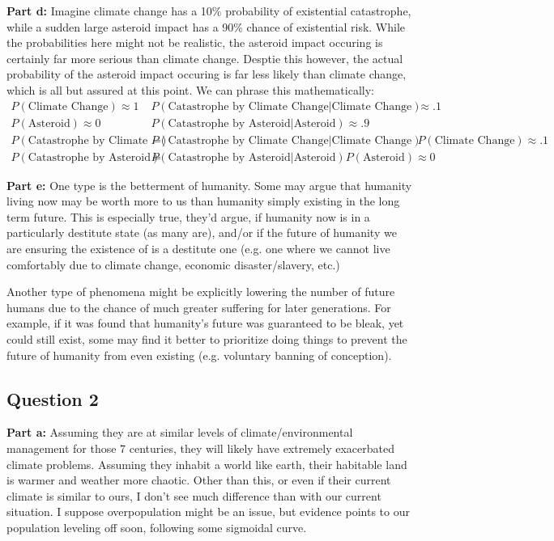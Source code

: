 \documentclass{article}
\begin{document}
\noindent\textbf{Part d:} Imagine climate change has a 10\% probability of existential catastrophe, while a sudden large asteroid impact has a 90\% chance of existential risk. While the probabilities here might not be realistic, the asteroid impact occuring is certainly far more serious than climate change. Desptie this however, the actual probability of the asteroid impact occuring is far less likely than climate change, which is all but assured at this point. We can phrase this mathematically:
\begin{align*}
    P(\text{Climate Change})\approx1\qquad&P(\text{Catastrophe by Climate Change}|\text{Climate Change})\approx.1\\
    P(\text{Asteroid})\approx0\qquad&P(\text{Catastrophe by Asteroid}|\text{Asteroid})\approx.9\\
    P(\text{Catastrophe by Climate Change})=&P(\text{Catastrophe by Climate Change}|\text{Climate Change})P(\text{Climate Change})\approx.1\\
    P(\text{Catastrophe by Asteroid})=&P(\text{Catastrophe by Asteroid}|\text{Asteroid})P(\text{Asteroid})\approx0
\end{align*}
\bigskip

\noindent\textbf{Part e:} One type is the betterment of humanity. Some may argue that humanity living now may be worth more to us than humanity simply existing in the long term future. This is especially true, they'd argue, if humanity now is in a particularly destitute state (as many are), and/or if the future of humanity we are ensuring the existence of is a destitute one (e.g. one where we cannot live comfortably due to climate change, economic disaster/slavery, etc.)

Another type of phenomena might be explicitly lowering the number of future humans due to the chance of much greater suffering for later generations. For example, if it was found that humanity's future was guaranteed to be bleak, yet could still exist, some may find it better to prioritize doing things to prevent the future of humanity from even existing (e.g. voluntary banning of conception).

\subsection*{Question 2}
\noindent\textbf{Part a:} Assuming they are at similar levels of climate/environmental management for those 7 centuries, they will likely have extremely exacerbated climate problems. Assuming they inhabit a world like earth, their habitable land is warmer and weather more chaotic. Other than this, or even if their current climate is similar to ours, I don't see much difference than with our current situation. I suppose overpopulation might be an issue, but evidence points to our population leveling off soon, following some sigmoidal curve.
\bigskip
\end{document}
